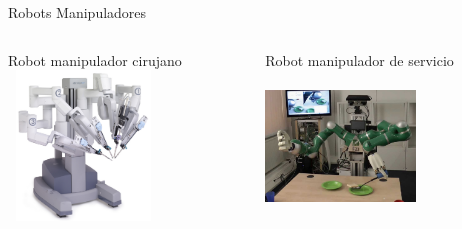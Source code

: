 \begin{frame}[shrink=20]{Robots Manipuladores}
\begin{columns}[T]
		\begin{column}{.33\textwidth}
			\begin{block}{\small{Robot manipulador cirujano}}	
				\centering
				\includegraphics[height=4cm,width=4cm]{Introduccion/med-robot.jpg}
			\end{block}
		\end{column}
		\begin{column}{.33\textwidth}
			\begin{block}{\small{Robot manipulador de servicio}}
				\scriptsize
				\centering
				\includegraphics[height=4cm,width=4cm]{Introduccion/serv-robot.jpg}
			\end{block}
		\end{column}
	\end{columns}
\end{frame}

